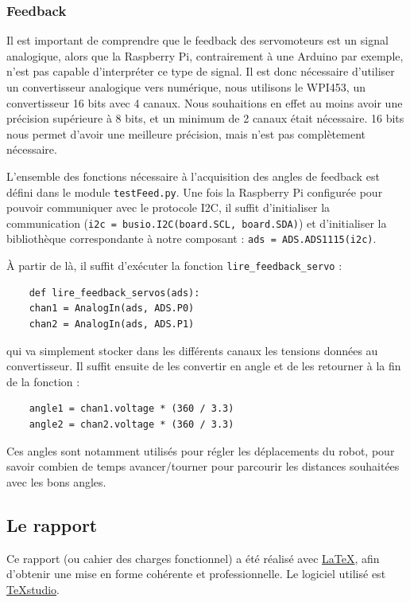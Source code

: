 \documentclass[a4paper,12pt]{report}  %
\begin{document}
\subsubsection{Feedback}

Il est important de comprendre que le feedback des servomoteurs est un signal analogique, alors que la Raspberry Pi, contrairement à une Arduino par exemple, n’est pas capable d’interpréter ce type de signal. Il est donc nécessaire d’utiliser un convertisseur analogique vers numérique, nous utilisons le WPI453, un convertisseur 16 bits avec 4 canaux. Nous souhaitions en effet au moins avoir une précision supérieure à 8 bits, et un minimum de 2 canaux était nécessaire. 16 bits nous permet d’avoir une meilleure précision, mais n’est pas complètement nécessaire.

L’ensemble des fonctions nécessaire à l’acquisition des angles de feedback est défini dans le module \texttt{testFeed.py}. Une fois la Raspberry Pi configurée pour pouvoir communiquer avec le protocole I2C, il suffit d’initialiser la communication (\texttt{i2c = busio.I2C(board.SCL, board.SDA)}) et d’initialiser la bibliothèque correspondante à notre composant : \texttt{ads = ADS.ADS1115(i2c)}.

À partir de là, il suffit d’exécuter la fonction \texttt{lire\_feedback\_servo} : 

\begin{lstlisting}
	def lire_feedback_servos(ads):
	chan1 = AnalogIn(ads, ADS.P0)
	chan2 = AnalogIn(ads, ADS.P1)
\end{lstlisting}

qui va simplement stocker dans les différents canaux les tensions données au convertisseur. Il suffit ensuite de les convertir en angle et de les retourner à la fin de la fonction :

\begin{lstlisting}
	angle1 = chan1.voltage * (360 / 3.3)
	angle2 = chan2.voltage * (360 / 3.3)
\end{lstlisting}

Ces angles sont notamment utilisés pour régler les déplacements du robot, pour savoir combien de temps avancer/tourner pour parcourir les distances souhaitées avec les bons angles.

\subsection{Le rapport}

Ce rapport (ou cahier des charges fonctionnel) a été réalisé avec \href{https://www.latex-project.org/}{\LaTeX}, afin d'obtenir une mise en forme cohérente et professionnelle. Le logiciel utilisé est \href{https://flathub.org/apps/org.texstudio.TeXstudio}{TeXstudio}. 
\end{document}
